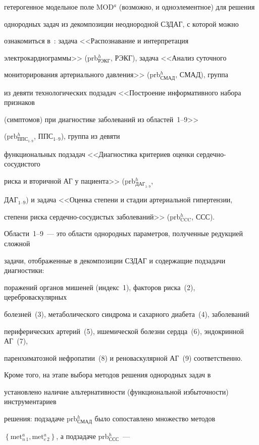 гетерогенное модельное поле MOD$^a$ (возможно, и одноэлементное) для решения


однородных задач из декомпозиции неоднородной СЗДАГ, с которой можно


ознакомиться в~\cite{4-kir}: задача <<Распознавание и интерпретация


электрокардиограммы>> (prb$^h_{\mathrm{РЭКГ}}$, РЭКГ), задача <<Анализ суточного


мониторирования артериального давления>> (prb$^h_{\mathrm{СМАД}}$, СМАД), группа


из девяти технологических подзадач <<Построение информативного набора признаков


(симптомов) при диагностике заболеваний из областей~1--9>>


 (prb$^h_{\mathrm{ППС}_{1\mbox{--}9}}$, ППС$_{1\mbox{--}9}$), группа из девяти


функциональных подзадач <<Диагностика критериев оценки сер\-деч\-но-со\-су\-ди\-сто\-го


риска и вторичной АГ у пациента>> (prb$^h_{\mathrm{ДАГ}_{1\mbox{--}9}}$,


ДАГ$_{1\mbox{--}9}$) и задача <<Оценка степени и стадии артериальной гипертензии,


степени риска сер\-деч\-но-со\-су\-ди\-стых заболеваний>> (prb$^h_{\mathrm{CCC}}$, ССС).


Области~1--9~--- это области однородных параметров, полученные редукцией сложной


задачи, отображенные в декомпозиции СЗДАГ и содержащие подзадачи диагностики:


поражений органов мишеней (индекс~1), факторов риска~(2), цереброваскулярных


болезней~(3), метаболического синдрома и сахарного диабета~(4), заболеваний


периферических артерий~(5), ишемической болезни сердца~(6), эндокринной АГ~(7),


паренхиматозной нефропатии~(8) и реноваскулярной АГ~(9) соответственно.





 Кроме того, на этапе выбора методов решения однородных задач в~\cite{4-kir}


установлено наличие альтернативности (функциональной избыточности) инструментариев


решения: подзадаче prb$^h_{\mathrm{СМАД}}$ было сопоставлено множество методов


$\left\{ \mathrm{met}^a_{n\,1}, \mathrm{met}^a_{e\,2}\right\}$, а подзадаче prb$^h_{\mathrm{ССС}}$~---


